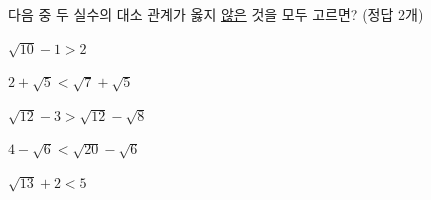 다음 중 두 실수의 대소 관계가 옳지 \underline{않은} 것을 모두 고르면? (정답 2개)
\begin{choicesii}{\rule[-3ex]{0pt}{8ex}$\sqrt{10}-1>2$}{\rule[-3ex]{0pt}{8ex}$2+\sqrt{5}<\sqrt{7}+\sqrt{5}$}{\rule[-3ex]{0pt}{8ex}$\sqrt{12}-3>\sqrt{12}-\sqrt{8}$}{\rule[-3ex]{0pt}{8ex}$4-\sqrt{6}<\sqrt{20}-\sqrt{6}$}{\rule[-3ex]{0pt}{8ex}$\sqrt{13}+2<5$}\end{choicesii}
